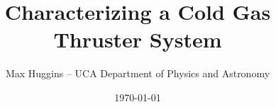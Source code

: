 \title{Characterizing a Cold Gas Thruster System}
\author{Max Huggins – UCA Department of Physics and Astronomy}
\date{\today}
\maketitle